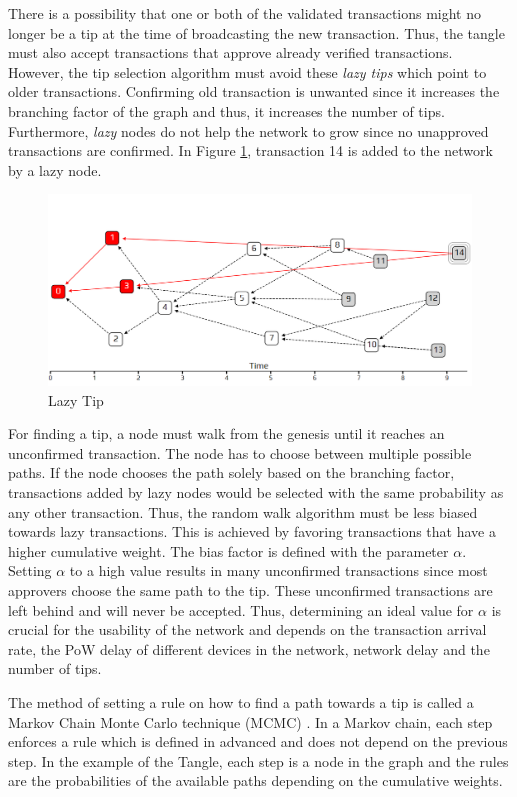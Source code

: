 There is a possibility that one or both of the validated transactions might no longer be a tip at the time of broadcasting the new transaction. Thus, the tangle must also accept transactions that approve already verified transactions. However, the tip selection algorithm must avoid these \textit{lazy tips} which point to older transactions. Confirming old transaction is unwanted since it increases the branching factor of the graph and thus, it increases the number of tips. Furthermore, \textit{lazy} nodes do not help the network to grow since no unapproved transactions are confirmed. In Figure \ref{fig:lazy-tip}, transaction 14 is added to the network by a lazy node. 


\begin{figure}[H]
    \centering
    \includegraphics[width=1.0\textwidth]{images/lazy-tip.png}
    \caption{Lazy Tip \cite{the-tangle-part-3}}
    \label{fig:lazy-tip}
\end{figure}

For finding a tip, a node must walk from the genesis until it reaches an unconfirmed transaction. The node has to choose between multiple possible paths. If the node chooses the path solely based on the branching factor, transactions added by lazy nodes would be selected with the same probability as any other transaction. Thus, the random walk algorithm must be less biased towards lazy transactions. 
This is achieved by favoring transactions that have a higher cumulative weight. The bias factor is defined with the parameter $\alpha$. Setting $\alpha$ to a high value results in many unconfirmed transactions since most approvers choose the same path to the tip. These unconfirmed transactions are left behind and will never be accepted. Thus, determining an ideal value for $\alpha$ is crucial for the usability of the network and depends on the transaction arrival rate, the PoW delay of different devices in the network, network delay and the number of tips. 

The method of setting a rule on how to find a path towards a tip is called a Markov Chain Monte Carlo technique (MCMC) \cite{mcmc}. In a Markov chain, each step enforces a rule which is defined in advanced and does not depend on the previous step. In the example of the Tangle, each step is a node in the graph and the rules are the probabilities of the available paths depending on the cumulative weights.
